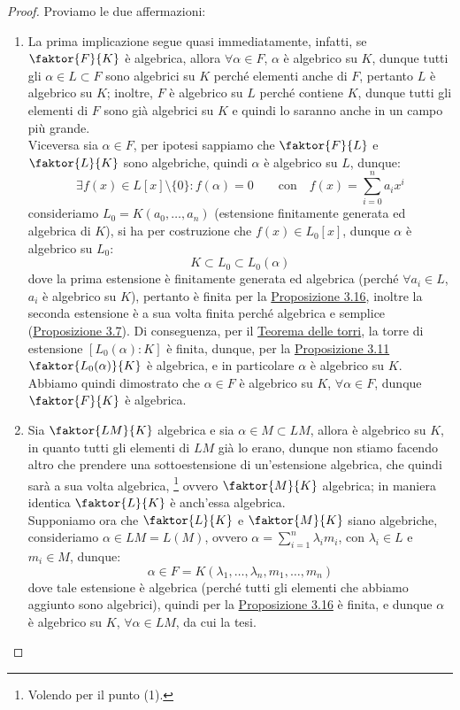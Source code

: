 \documentclass[11pt]{scrartcl}
\begin{document}
\begin{proof}
    Proviamo le due affermazioni:
    \begin{enumerate}[(1)]
        \item La prima implicazione segue quasi immediatamente, infatti, se $\faktor{F}{K}$ è algebrica, allora $\forall \alpha \in F$, $\alpha$ è algebrico su $K$,
            dunque tutti gli $\alpha \in L \subset F$ sono algebrici su $K$ perché elementi anche di $F$, pertanto $L$ è algebrico su $K$;
	    inoltre, $F$ è algebrico su $L$ perché contiene $K$, dunque tutti gli elementi di $F$ sono già algebrici su $K$ e quindi lo saranno anche in un campo più grande.\\
            Viceversa sia $\alpha \in F$, per ipotesi sappiamo che $\faktor{F}{L}$ e $\faktor{L}{K}$ sono algebriche, quindi $\alpha$ è algebrico su $L$, dunque:
            \[ \exists f(x) \in L[x]\setminus\{0\} : f(\alpha) = 0 \qquad \text{con} \quad f(x) = \sum_{i=0}^n a_ix^i
                \]
            consideriamo $L_0=K(a_0,\ldots,a_n)$ (estensione finitamente generata ed algebrica di $K$), si ha per costruzione che $f(x) \in L_0[x]$, dunque $\alpha$ è algebrico su $L_0$:
            \[ K \subset L_0 \subset L_0(\alpha)
                \]
            dove la prima estensione è finitamente generata ed algebrica (perché $\forall a_i \in L$, $a_i$ è algebrico su $K$), pertanto è finita per la \hyperref[3.16]{Proposizione 3.16}, 
	    inoltre la seconda estensione è a sua volta finita perché algebrica e semplice (\hyperref[3.7]{Proposizione 3.7}). 
	    Di conseguenza, per il \hyperref[torri]{Teorema delle torri}, la torre di estensione $[L_0(\alpha) : K]$ è finita,
	    dunque, per la \hyperref[3.11]{Proposizione 3.11} $\faktor{L_0(\alpha)}{K}$ è algebrica, e in particolare $\alpha$ è algebrico su $K$.
	    Abbiamo quindi dimostrato che $\alpha \in F$ è algebrico su $K$, $\forall \alpha \in F$,
            dunque $\faktor{F}{K}$ è algebrica.
         \item Sia $\faktor{LM}{K}$ algebrica e sia $\alpha \in M \subset LM$, allora è algebrico su $K$, in quanto tutti gli elementi di $LM$ già lo erano, dunque non stiamo facendo altro che prendere una sottoestensione di un'estensione algebrica, che quindi 
         sarà a sua volta algebrica, \footnote{Volendo per il punto (1).}
	 ovvero $\faktor{M}{K}$ algebrica; in maniera identica $\faktor{L}{K}$ è anch'essa algebrica.\\
         Supponiamo ora che $\faktor{L}{K}$ e $\faktor{M}{K}$ siano algebriche, consideriamo $\alpha \in LM = L(M)$, ovvero $\alpha = \sum_{i=1}^{n} \lambda_i m_i$, con $\lambda_i \in L$ e $m_i \in M$, dunque:
         \[ \alpha \in F = K(\lambda_1,\ldots,\lambda_n,m_1,\ldots,m_n)
            \]
        dove tale estensione è algebrica (perché tutti gli elementi che abbiamo aggiunto sono algebrici), quindi per la \hyperref[3.16]{Proposizione 3.16} è finita,
        e dunque $\alpha$ è algebrico su $K$, $\forall \alpha \in LM$, da cui la tesi.
    \end{enumerate}
\end{proof}
\end{document}
